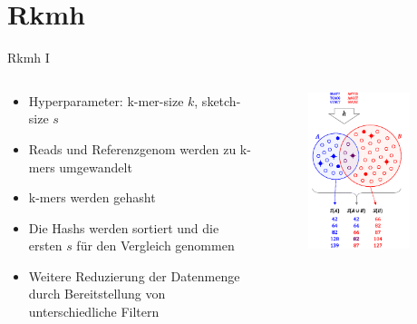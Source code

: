 \section{Rkmh}

\begin{frame}{Rkmh I}
    \begin{columns} %
        \begin{column}{.60\textwidth}
            \begin{itemize}
                \item Hyperparameter: k-mer-size $ k $, sketch-size $ s $ \pause
                \item Reads und Referenzgenom werden zu k-mers umgewandelt \pause
                \item k-mers werden gehasht \pause
                \item Die Hashs werden sortiert und die ersten $ s $ für den Vergleich genommen \pause
                \item Weitere Reduzierung der Datenmenge durch Bereitstellung von unterschiedliche Filtern \pause
            \end{itemize}
        \end{column}
        \hfill
        \begin{column}{.40\textwidth}
            \begin{figure}[H]
                \centering
                \includegraphics[width=0.85\textwidth]{images/mash_similarity.png} 

\end{figure}
\end{column}
\end{columns}
\end{frame}
